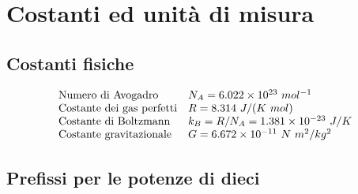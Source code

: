 \chapter{Costanti ed unità di misura}

\section*{Costanti fisiche}

\begin{equation*}
	\begin{array}{ l l }
		\text{Numero di Avogadro} & N_A =6.022\times 10^{23} \ mol^{-1}\\
		\text{Costante dei gas perfetti} & R=8.314\ J/( K\ mol)\\
		\text{Costante di Boltzmann} & k_B =R/N_A =1.381\times 10^{-23} \ J/K\\
		\text{Costante gravitazionale} & G=6.672\times 10^{-11} \ N\ m^2 /kg^2
	\end{array}
\end{equation*}


\section*{Prefissi per le potenze di dieci}

